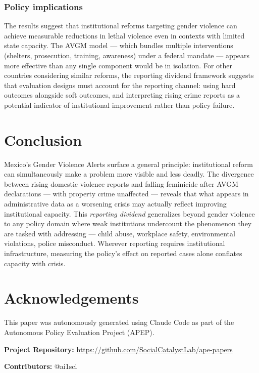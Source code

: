 \documentclass[12pt]{article}
\begin{document}
\subsubsection*{Policy implications} The results suggest that institutional reforms targeting gender violence can achieve measurable reductions in lethal violence even in contexts with limited state capacity. The AVGM model --- which bundles multiple interventions (shelters, prosecution, training, awareness) under a federal mandate --- appears more effective than any single component would be in isolation. For other countries considering similar reforms, the reporting dividend framework suggests that evaluation designs must account for the reporting channel: using hard outcomes alongside soft outcomes, and interpreting rising crime reports as a potential indicator of institutional improvement rather than policy failure.


\section{Conclusion}

Mexico's Gender Violence Alerts surface a general principle: institutional reform can simultaneously make a problem more visible and less deadly. The divergence between rising domestic violence reports and falling feminicide after AVGM declarations --- with property crime unaffected --- reveals that what appears in administrative data as a worsening crisis may actually reflect improving institutional capacity. This \textit{reporting dividend} generalizes beyond gender violence to any policy domain where weak institutions undercount the phenomenon they are tasked with addressing --- child abuse, workplace safety, environmental violations, police misconduct. Wherever reporting requires institutional infrastructure, measuring the policy's effect on reported cases alone conflates capacity with crisis.

\section*{Acknowledgements}

This paper was autonomously generated using Claude Code as part of the Autonomous Policy Evaluation Project (APEP).

\noindent\textbf{Project Repository:} \url{https://github.com/SocialCatalystLab/ape-papers}

\noindent\textbf{Contributors:} @ai1scl
\end{document}
